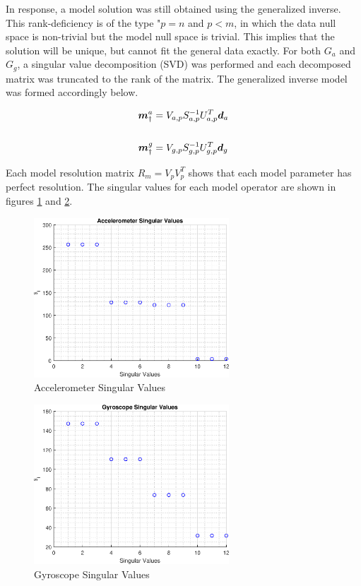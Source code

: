 In response, a model solution was still obtained using the generalized inverse. This rank-deficiency is of the type "$p = n$ and $p < m$, in which the data null space is non-trivial but the model null space is trivial. This implies that the solution will be unique, but cannot fit the general data exactly. For both $G_a$ and $G_g$, a singular value decomposition (SVD) was performed and each decomposed matrix was truncated to the rank of the matrix. The generalized inverse model was formed accordingly below.

\begin{align}
	\boldsymbol{m}_{\dagger}^{a} &= V_{a,p} S_{a,p}^{-1} U_{a,p}^T \boldsymbol{d}_a \notag\\
	\\
	\boldsymbol{m}_{\dagger}^{g} &= V_{g,p} S_{g,p}^{-1} U_{g,p}^T \boldsymbol{d}_g \notag
\end{align}

Each model resolution matrix $R_m = V_p V_p^T$ shows that each model parameter has perfect resolution. The singular values for each model operator are shown in figures \ref{fig: multi-axis accelerometer singular values} and \ref{fig: multi-axis gyroscope singular values}. 

\begin{figure}[h] 
	\centering
	\includegraphics[width=0.65\textwidth]{./images/MAM_accel_singular_values.eps}
	\caption{Accelerometer Singular Values}
	\label{fig: multi-axis accelerometer singular values}
\end{figure}
\FloatBarrier

\begin{figure}[h] 
	\centering
	\includegraphics[width=0.65\textwidth]{./images/MAM_gyro_singular_values.eps}
	\caption{Gyroscope Singular Values}
	\label{fig: multi-axis gyroscope singular values}
\end{figure}
\FloatBarrier


